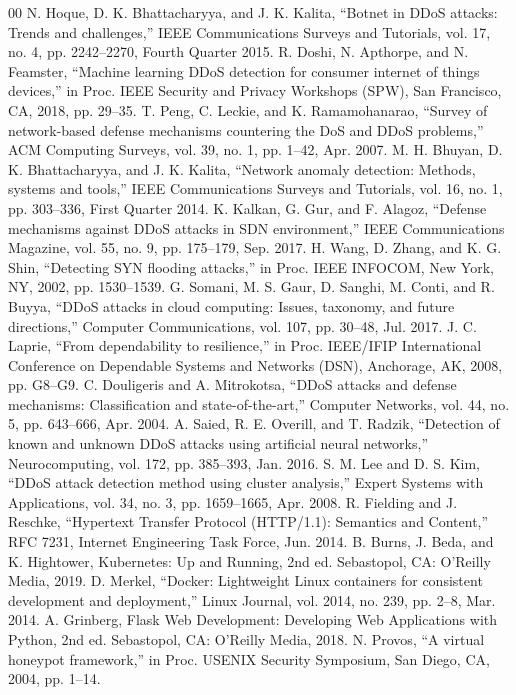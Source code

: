 \documentclass[conference]{IEEEtran}
\begin{document}
\begin{thebibliography}{00}
 N. Hoque, D. K. Bhattacharyya, and J. K. Kalita, ``Botnet in DDoS attacks: Trends and challenges,'' IEEE Communications Surveys and Tutorials, vol. 17, no. 4, pp. 2242--2270, Fourth Quarter 2015.
 R. Doshi, N. Apthorpe, and N. Feamster, ``Machine learning DDoS detection for consumer internet of things devices,'' in Proc. IEEE Security and Privacy Workshops (SPW), San Francisco, CA, 2018, pp. 29--35.
 T. Peng, C. Leckie, and K. Ramamohanarao, ``Survey of network-based defense mechanisms countering the DoS and DDoS problems,'' ACM Computing Surveys, vol. 39, no. 1, pp. 1--42, Apr. 2007.
 M. H. Bhuyan, D. K. Bhattacharyya, and J. K. Kalita, ``Network anomaly detection: Methods, systems and tools,'' IEEE Communications Surveys and Tutorials, vol. 16, no. 1, pp. 303--336, First Quarter 2014.
 K. Kalkan, G. Gur, and F. Alagoz, ``Defense mechanisms against DDoS attacks in SDN environment,'' IEEE Communications Magazine, vol. 55, no. 9, pp. 175--179, Sep. 2017.
 H. Wang, D. Zhang, and K. G. Shin, ``Detecting SYN flooding attacks,'' in Proc. IEEE INFOCOM, New York, NY, 2002, pp. 1530--1539.
 G. Somani, M. S. Gaur, D. Sanghi, M. Conti, and R. Buyya, ``DDoS attacks in cloud computing: Issues, taxonomy, and future directions,'' Computer Communications, vol. 107, pp. 30--48, Jul. 2017.
 J. C. Laprie, ``From dependability to resilience,'' in Proc. IEEE/IFIP International Conference on Dependable Systems and Networks (DSN), Anchorage, AK, 2008, pp. G8--G9.
 C. Douligeris and A. Mitrokotsa, ``DDoS attacks and defense mechanisms: Classification and state-of-the-art,'' Computer Networks, vol. 44, no. 5, pp. 643--666, Apr. 2004.
 A. Saied, R. E. Overill, and T. Radzik, ``Detection of known and unknown DDoS attacks using artificial neural networks,'' Neurocomputing, vol. 172, pp. 385--393, Jan. 2016.
 S. M. Lee and D. S. Kim, ``DDoS attack detection method using cluster analysis,'' Expert Systems with Applications, vol. 34, no. 3, pp. 1659--1665, Apr. 2008.
 R. Fielding and J. Reschke, ``Hypertext Transfer Protocol (HTTP/1.1): Semantics and Content,'' RFC 7231, Internet Engineering Task Force, Jun. 2014.
 B. Burns, J. Beda, and K. Hightower, Kubernetes: Up and Running, 2nd ed. Sebastopol, CA: O'Reilly Media, 2019.
 D. Merkel, ``Docker: Lightweight Linux containers for consistent development and deployment,'' Linux Journal, vol. 2014, no. 239, pp. 2--8, Mar. 2014.
 A. Grinberg, Flask Web Development: Developing Web Applications with Python, 2nd ed. Sebastopol, CA: O'Reilly Media, 2018.
 N. Provos, ``A virtual honeypot framework,'' in Proc. USENIX Security Symposium, San Diego, CA, 2004, pp. 1--14.
\end{thebibliography}
\end{document}
